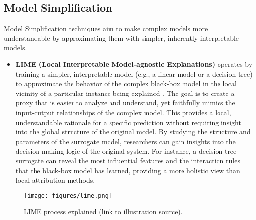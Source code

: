\subsection{Model Simplification}
Model Simplification techniques aim to make complex models more understandable by approximating them with simpler, inherently interpretable models.
\begin{itemize}
    \item \textbf{LIME (Local Interpretable Model-agnostic Explanations)} operates by training a simpler, interpretable model (e.g., a linear model or a decision tree) to approximate the behavior of the complex black-box model in the local vicinity of a particular instance being explained \cite{ribeiro2016why}. The goal is to create a proxy that is easier to analyze and understand, yet faithfully mimics the input-output relationships of the complex model. This provides a local, understandable rationale for a specific prediction without requiring insight into the global structure of the original model. By studying the structure and parameters of the surrogate model, researchers can gain insights into the decision-making logic of the original system. For instance, a decision tree surrogate can reveal the most influential features and the interaction rules that the black-box model has learned, providing a more holistic view than local attribution methods.
\end{itemize}

\begin{figure}[H]
    \centering
    \texttt{[image: figures/lime.png]}
    \caption{LIME process explained (\href{https://medium.com/data-science/lime-explain-machine-learning-predictions-af8f18189bfe}{link to illustration source}).}
    \label{fig:lime_example}
\end{figure}

